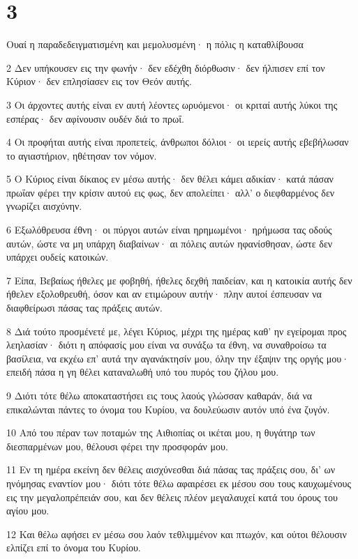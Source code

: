 \chapter{3}

\par Ουαί η παραδεδειγματισμένη και μεμολυσμένη· η πόλις η καταθλίβουσα
\par 2 Δεν υπήκουσεν εις την φωνήν· δεν εδέχθη διόρθωσιν· δεν ήλπισεν επί τον Κύριον· δεν επλησίασεν εις τον Θεόν αυτής.
\par 3 Οι άρχοντες αυτής είναι εν αυτή λέοντες ωρυόμενοι· οι κριταί αυτής λύκοι της εσπέρας· δεν αφίνουσιν ουδέν διά το πρωΐ.
\par 4 Οι προφήται αυτής είναι προπετείς, άνθρωποι δόλιοι· οι ιερείς αυτής εβεβήλωσαν το αγιαστήριον, ηθέτησαν τον νόμον.
\par 5 Ο Κύριος είναι δίκαιος εν μέσω αυτής· δεν θέλει κάμει αδικίαν· κατά πάσαν πρωΐαν φέρει την κρίσιν αυτού εις φως, δεν απολείπει· αλλ' ο διεφθαρμένος δεν γνωρίζει αισχύνην.
\par 6 Εξωλόθρευσα έθνη· οι πύργοι αυτών είναι ηρημωμένοι· ηρήμωσα τας οδούς αυτών, ώστε να μη υπάρχη διαβαίνων· αι πόλεις αυτών ηφανίσθησαν, ώστε δεν υπάρχει ουδείς κατοικών.
\par 7 Είπα, Βεβαίως ήθελες με φοβηθή, ήθελες δεχθή παιδείαν, και η κατοικία αυτής δεν ήθελεν εξολοθρευθή, όσον και αν ετιμώρουν αυτήν· πλην αυτοί έσπευσαν να διαφθείρωσι πάσας τας πράξεις αυτών.
\par 8 Διά τούτο προσμένετέ με, λέγει Κύριος, μέχρι της ημέρας καθ' ην εγείρομαι προς λεηλασίαν· διότι η απόφασίς μου είναι να συνάξω τα έθνη, να συναθροίσω τα βασίλεια, να εκχέω επ' αυτά την αγανάκτησίν μου, όλην την έξαψιν της οργής μου· επειδή πάσα η γη θέλει καταναλωθή υπό του πυρός του ζήλου μου.
\par 9 Διότι τότε θέλω αποκαταστήσει εις τους λαούς γλώσσαν καθαράν, διά να επικαλώνται πάντες το όνομα του Κυρίου, να δουλεύωσιν αυτόν υπό ένα ζυγόν.
\par 10 Από του πέραν των ποταμών της Αιθιοπίας οι ικέται μου, η θυγάτηρ των διεσπαρμένων μου, θέλουσι φέρει την προσφοράν μου.
\par 11 Εν τη ημέρα εκείνη δεν θέλεις αισχύνεσθαι διά πάσας τας πράξεις σου, δι' ων ηνόμησας εναντίον μου· διότι τότε θέλω αφαιρέσει εκ μέσου σου τους καυχωμένους εις την μεγαλοπρέπειάν σου, και δεν θέλεις πλέον μεγαλαυχεί κατά του όρους του αγίου μου.
\par 12 Και θέλω αφήσει εν μέσω σου λαόν τεθλιμμένον και πτωχόν, και ούτοι θέλουσιν ελπίζει επί το όνομα του Κυρίου.
